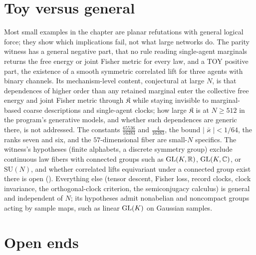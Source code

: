 \section{Toy versus general}
\label{comp:ch07-toy}

Most small examples in the chapter are planar refutations with general logical force; they show
which implications fail, not what large networks do. The parity witness has a general negative part, that no rule reading single-agent
marginals returns the free energy or joint Fisher metric for every law, and a TOY positive part, the
existence of a smooth symmetric correlated lift for three agents with binary channels. Its
mechanism-level content, conjectural at large $N$, is that dependences of higher order than any
retained marginal enter the collective free energy and joint Fisher metric through $\mathfrak K$ while
staying invisible to marginal-based coarse descriptions and single-agent clocks; how large
$\mathfrak K$ is at $N\geq512$ in the program's generative models, and whether such dependences are
generic there, is not addressed. The constants $\tfrac{65536}{16383}$ and $\tfrac{4}{16383}$, the bound
$|\bar\varkappa|<1/64$, the ranks seven and six, and the $57$-dimensional fiber are small-$N$ specifics.
The witness's hypotheses (finite alphabets, a discrete symmetry group) exclude continuous law fibers
with connected groups such as $\mathrm{GL}(K,\mathbb R)$, $\mathrm{GL}(K,\mathbb C)$, or $\mathrm{SU}(N)$, and whether
correlated lifts equivariant under a connected group exist there is open
(). Everything else (tensor descent, Fisher loss, record clocks, clock
invariance, the orthogonal-clock criterion, the semiconjugacy calculus) is general and independent of
$N$; its hypotheses admit nonabelian and noncompact groups acting by sample maps, such as linear
$\mathrm{GL}(K)$ on Gaussian samples.

\section{Open ends}
\label{comp:ch07-open}

